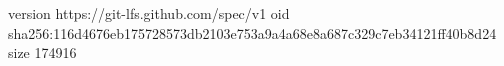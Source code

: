 version https://git-lfs.github.com/spec/v1
oid sha256:116d4676eb175728573db2103e753a9a4a68e8a687c329c7eb34121ff40b8d24
size 174916
